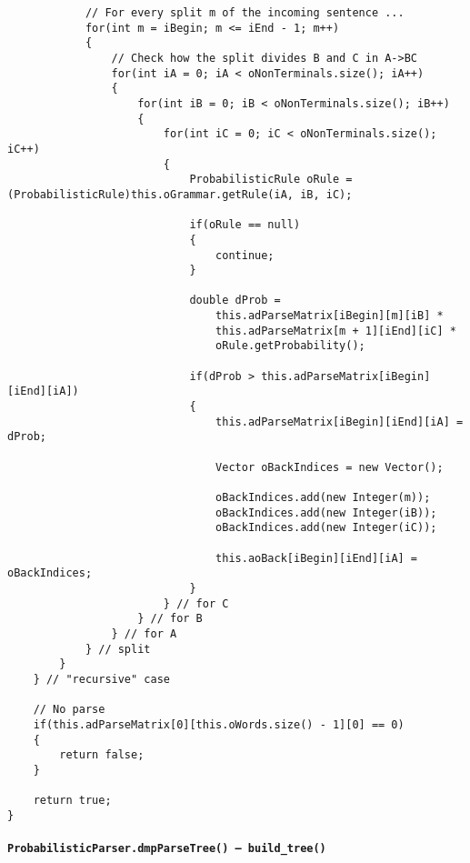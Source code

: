 \begin{verbatim}
            // For every split m of the incoming sentence ...
            for(int m = iBegin; m <= iEnd - 1; m++)
            {
                // Check how the split divides B and C in A->BC
                for(int iA = 0; iA < oNonTerminals.size(); iA++)
                {
                    for(int iB = 0; iB < oNonTerminals.size(); iB++)
                    {
                        for(int iC = 0; iC < oNonTerminals.size(); iC++)
                        {
                            ProbabilisticRule oRule = (ProbabilisticRule)this.oGrammar.getRule(iA, iB, iC);

                            if(oRule == null)
                            {
                                continue;
                            }

                            double dProb =
                                this.adParseMatrix[iBegin][m][iB] *
                                this.adParseMatrix[m + 1][iEnd][iC] *
                                oRule.getProbability();

                            if(dProb > this.adParseMatrix[iBegin][iEnd][iA])
                            {
                                this.adParseMatrix[iBegin][iEnd][iA] = dProb;

                                Vector oBackIndices = new Vector();

                                oBackIndices.add(new Integer(m));
                                oBackIndices.add(new Integer(iB));
                                oBackIndices.add(new Integer(iC));

                                this.aoBack[iBegin][iEnd][iA] = oBackIndices;
                            }
                        } // for C
                    } // for B
                } // for A
            } // split
        }
    } // "recursive" case

    // No parse
    if(this.adParseMatrix[0][this.oWords.size() - 1][0] == 0)
    {
        return false;
    }

    return true;
}
\end{verbatim}
\normalsize

\paragraph{\texttt{ProbabilisticParser.dmpParseTree() -- build\_tree()}}

